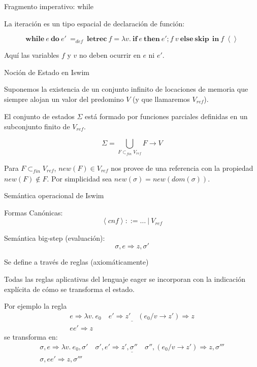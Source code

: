 \documentclass{beamer}
\newcommand{\s}{\sigma }
\newcommand{\la}{\left\langle }
\newcommand{\ra}{\right\rangle }
\newcommand{\ife}{\mathbf{if}\ }
\newcommand{\ine}{\ \mathbf{in}\ }
\newcommand{\thene}{\ \mathbf{then}\ }
\newcommand{\elsee}{\ \mathbf{else}\ }
\newcommand{\while}{\mathbf{while}\ }
\newcommand{\doc}{\ \mathbf{do}\ }
\begin{document}
\begin{frame}{Fragmento imperativo: while}

La iteración es un tipo espacial de declaración de función:

\[
\while e\doc e'\ =_{def}\ \textbf{letrec}\ f=\lambda v.\ \ife e\thene e';f\ v\elsee \textbf{skip}\ \ine f\ \la\ra
\]

Aquí las variables $f$ y $v$ no deben ocurrir en $e$ ni $e'$.

\end{frame}



\begin{frame}{Noción de Estado en Iswim}

  Suponemos la existencia de un conjunto infinito de locaciones de
  memoria que siempre alojan un valor del predomino $V$ (y que
  llamaremos $V_{\mathit{ref}}$).
  \pause

  \bigskip

  El conjunto de estados $\Sigma$ está formado por funciones parciales
  definidas en un subconjunto finito de $V_{\mathit{ref}}$.

  \[\Sigma = \bigcup_{F \subset_{\mathit{fin}} V_{\mathit{ref}}} F\rightarrow V\]

  Para $F \subset_{\mathit{fin}} V_{\mathit{ref}}$, $new(F)\in V_{\mathit{ref}}$ nos
  provee de una referencia con la propiedad $new(F)\notin F$. Por
  simplicidad sea $new(\sigma)=new(dom(\sigma))$.

\end{frame}



\begin{frame}{Semántica operacional de Iswim}

Formas Canónicas:
\[
\la cnf\ra ::= \ldots\ |\ V_{\mathit{ref}}
\]

\bigskip
\pause
Semántica big-step (evaluación):
\[
\s,e \Rightarrow z,\s'
\]


Se define a través de reglas (axiomáticamente)

\end{frame}



\begin{frame}
  Todas las reglas aplicativas del lenguaje eager se incorporan con la
  indicación explícita de cómo se transforma el estado.  \pause
  \bigskip

  Por ejemplo la regla
\[
\begin{array}{c}
\underline{e \Rightarrow \lambda v.\ e_0\quad e' \Rightarrow z' \quad (e_0/v\rightarrow z') \Rightarrow z}\\
ee' \Rightarrow z
\end{array}
\]
se transforma en:
\[
\begin{array}{c}
\underline{\s,e \Rightarrow \lambda v.\ e_0,\s'\quad \s', e' \Rightarrow z',\s''\quad \s'', (e_0/v\rightarrow z') \Rightarrow z,\s'''}\\
\s, ee' \Rightarrow z,\s'''
\end{array}
\]
\end{frame}
\end{document}
